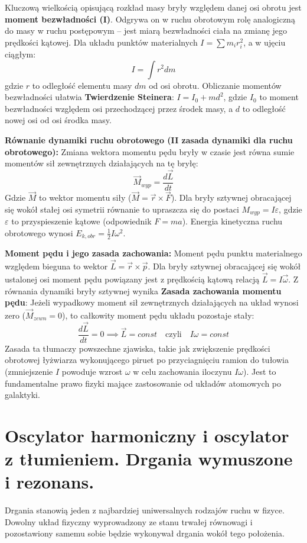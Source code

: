 \documentclass[11pt, a4paper]{article}
\begin{document}
Kluczową wielkością opisującą rozkład masy bryły względem danej osi obrotu jest \textbf{moment bezwładności (I)}. Odgrywa on w ruchu obrotowym rolę analogiczną do masy w ruchu postępowym – jest miarą bezwładności ciała na zmianę jego prędkości kątowej. Dla układu punktów materialnych $I = \sum m_i r_i^2$, a w ujęciu ciągłym:
\[
I = \int r^2 dm
\]
gdzie $r$ to odległość elementu masy $dm$ od osi obrotu. Obliczanie momentów bezwładności ułatwia \textbf{Twierdzenie Steinera}: $I = I_0 + md^2$, gdzie $I_0$ to moment bezwładności względem osi przechodzącej przez środek masy, a $d$ to odległość nowej osi od osi środka masy.

\textbf{Równanie dynamiki ruchu obrotowego (II zasada dynamiki dla ruchu obrotowego):}
Zmiana wektora momentu pędu bryły w czasie jest równa sumie momentów sił zewnętrznych działających na tę bryłę:
\[
\vec{M}_{wyp} = \frac{d\vec{L}}{dt}
\]
Gdzie $\vec{M}$ to wektor momentu siły ($\vec{M} = \vec{r} \times \vec{F}$). Dla bryły sztywnej obracającej się wokół stałej osi symetrii równanie to upraszcza się do postaci $M_{wyp} = I\varepsilon$, gdzie $\varepsilon$ to przyspieszenie kątowe (odpowiednik $F = ma$). Energia kinetyczna ruchu obrotowego wynosi $E_{k, obr} = \frac{1}{2}I\omega^2$.

\textbf{Moment pędu i jego zasada zachowania:}
Moment pędu punktu materialnego względem bieguna to wektor $\vec{L} = \vec{r} \times \vec{p}$. Dla bryły sztywnej obracającej się wokół ustalonej osi moment pędu powiązany jest z prędkością kątową relacją $\vec{L} = I\vec{\omega}$.
Z równania dynamiki bryły sztywnej wynika \textbf{Zasada zachowania momentu pędu}: 
Jeżeli wypadkowy moment sił zewnętrznych działających na układ wynosi zero ($\vec{M}_{zewn} = 0$), to całkowity moment pędu układu pozostaje stały:
\[
\frac{d\vec{L}}{dt} = 0 \implies \vec{L} = const \quad \text{czyli} \quad I\omega = const
\]
Zasada ta tłumaczy powszechne zjawiska, takie jak zwiększenie prędkości obrotowej łyżwiarza wykonującego piruet po przyciagnięciu ramion do tułowia (zmniejszenie $I$ powoduje wzrost $\omega$ w celu zachowania iloczynu $I\omega$). Jest to fundamentalne prawo fizyki mające zastosowanie od układów atomowych po galaktyki.

\section{Oscylator harmoniczny i oscylator z tłumieniem. Drgania wymuszone i rezonans.}

Drgania stanowią jeden z najbardziej uniwersalnych rodzajów ruchu w fizyce. Dowolny układ fizyczny wyprowadzony ze stanu trwałej równowagi i pozostawiony samemu sobie będzie wykonywał drgania wokół tego położenia.
\end{document}
